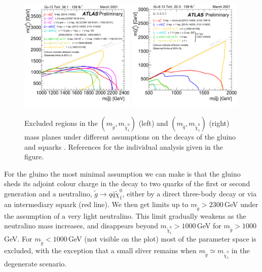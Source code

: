 \documentclass[notes.tex]{subfiles}
\begin{document}
\begin{figure}[t!]
\begin{center}
\includegraphics[width=0.49\textwidth]{figures/gluino_limit} 
\includegraphics[width=0.49\textwidth]{figures/squark_limit} 
\caption{Excluded regions in the $(m_{\tilde g}, m_{\tilde\chi_1^0})$ (left) and $(m_{\tilde q},m_{\tilde\chi_1^0})$ (right) mass planes under different assumptions on the decays of the gluino and squarks \cite{ATL-PHYS-PUB-2021-019}. References for the individual analysis given in the figure.}
\label{fig:gluino_squarklimit}
\end{center}
\end{figure}

For the gluino the most minimal assumption we can make is that the gluino sheds its adjoint colour charge in the decay to two quarks of the first or second generation and a neutralino, $\tilde g \to q\bar q\tilde\chi_1^0$, either by a direct three-body decay or via an intermediary squark (red line).  We then get limits up to $m_{\tilde{g}}>2300$\,GeV under the assumption of a very light neutralino. This limit gradually weakens as the neutralino mass increases, and disappears beyond $m_{\tilde{\chi}_1^0}>1000$\,GeV for $m_{\tilde{g}}>1000$\,GeV. For $m_{\tilde{g}}<1000$\,GeV (not visible on the plot) most of the parameter space is excluded, with the exception that a small sliver remains when $m_{\tilde{g}} \simeq m_{\tilde{\chi}_1^0}$ in the degenerate scenario.
\end{document}
